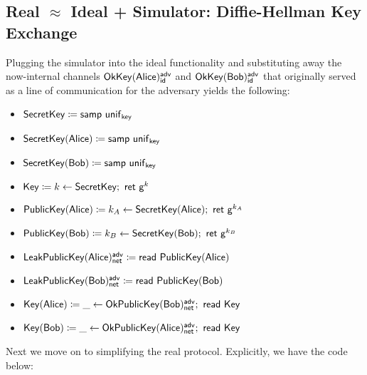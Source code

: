 \subsection{Real \texorpdfstring{$\approx$}{Approximates} Ideal + Simulator: Diffie-Hellman Key Exchange}
Plugging the simulator into the ideal functionality and substituting away the now-internal channels $\mathsf{OkKey}(\mathsf{Alice})^{\mathsf{adv}}_{\mathsf{id}}$ and $\mathsf{OkKey}(\mathsf{Bob})^{\mathsf{adv}}_{\mathsf{id}}$ that originally served as a line of communication for the adversary yields the following:

\begin{itemize}
\item $\mathsf{SecretKey} \coloneqq \mathsf{samp} \ \mathsf{unif}_{\mathsf{key}}$
\item $\mathsf{SecretKey}(\mathsf{Alice}) \coloneqq \mathsf{samp} \ \mathsf{unif}_{\mathsf{key}}$
\item $\mathsf{SecretKey}(\mathsf{Bob}) \coloneqq \mathsf{samp} \ \mathsf{unif}_{\mathsf{key}}$
\item $\mathsf{Key} \coloneqq k \leftarrow \mathsf{SecretKey}; \ \mathsf{ret} \ \mathsf{g}^k$
\item $\mathsf{PublicKey}(\mathsf{Alice}) \coloneqq k_A \leftarrow \mathsf{SecretKey}(\mathsf{Alice}); \ \mathsf{ret} \ \mathsf{g}^{k_A}$
\item $\mathsf{PublicKey}(\mathsf{Bob}) \coloneqq k_B \leftarrow \mathsf{SecretKey}(\mathsf{Bob}); \ \mathsf{ret} \ \mathsf{g}^{k_B}$
\item $\mathsf{LeakPublicKey}(\mathsf{Alice})^{\mathsf{adv}}_{\mathsf{net}} \coloneqq \mathsf{read} \ \mathsf{PublicKey}(\mathsf{Alice})$
\item $\mathsf{LeakPublicKey}(\mathsf{Bob})^{\mathsf{adv}}_{\mathsf{net}} \coloneqq \mathsf{read} \ \mathsf{PublicKey}(\mathsf{Bob})$
\item $\mathsf{Key}(\mathsf{Alice}) \coloneqq \_ \leftarrow \mathsf{OkPublicKey}(\mathsf{Bob})^{\mathsf{adv}}_{\mathsf{net}}; \ \mathsf{read} \ \mathsf{Key}$
\item $\mathsf{Key}(\mathsf{Bob}) \coloneqq \_ \leftarrow \mathsf{OkPublicKey}(\mathsf{Alice})^{\mathsf{adv}}_{\mathsf{net}}; \ \mathsf{read} \ \mathsf{Key}$
\end{itemize}

\noindent Next we move on to simplifying the real protocol.  Explicitly, we have the code below:


